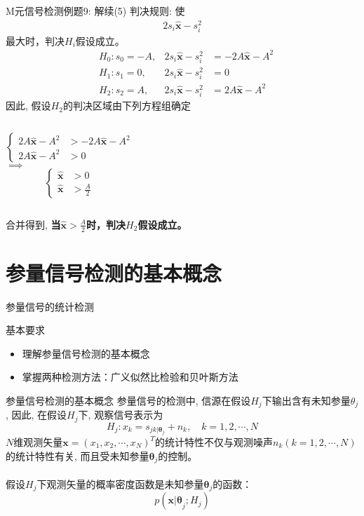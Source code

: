 \begin{frame}[shrink]{M元信号检测例题9: 解续(5)}
判决规则: 使
\begin{align*}
2s_i\bm{\hat{x}}-s_i^2
\end{align*}
最大时，判决$H_i$假设成立。
\begin{align*}
&H_0: s_0=-A, &2s_i\bm{\hat{x}}-s_i^2&=-2A\bm{\hat{x}}-A^2\\
&H_1: s_1=0, &2s_i\bm{\hat{x}}-s_i^2&=0\\
&H_2: s_2=A, &2s_i\bm{\hat{x}}-s_i^2&=2A\bm{\hat{x}}-A^2
\end{align*}
因此, 假设$H_2$的判决区域由下列方程组确定
\begin{columns}
$$
\begin{cases}
2A\bm{\hat{x}}-A^2 &> -2A\bm{\hat{x}}-A^2\\
2A\bm{\hat{x}}-A^2 &> 0
\end{cases}
$$
$\implies$
$$
\begin{cases}
\bm{\hat{x}}&> 0\\
\bm{\hat{x}}&> \frac{A}{2}
\end{cases}
$$
\end{columns}
合并得到, \textbf{当$\bm{\hat{x}}>\frac{A}{2}$时，判决$H_2$假设成立。}
\end{frame}

\section{参量信号检测的基本概念}

\begin{frame}{参量信号的统计检测}
\begin{block}{基本要求}
	\begin{itemize}
		\setlength{\itemsep}{.5cm}
		\item 理解参量信号检测的基本概念
		\item 掌握两种检测方法：广义似然比检验和贝叶斯方法		
	\end{itemize}
\end{block}
\end{frame}

\begin{frame}[shrink]{参量信号检测的基本概念}
参量信号的检测中, 信源在假设$H_j$下输出含有未知参量$\theta_j$, 因此, 在假设$H_j$下, 观察信号表示为
\[ H_j: x_k=s_{jk|\bm{\theta}_j} + n_k,\quad k=1,2,\cdots,N \]
$N$维观测矢量$\bm{x}=(x_1,x_2,\cdots,x_N)^T$的统计特性不仅与观测噪声$n_k(k=1,2,\cdots,N)$的统计特性有关, 而且受未知参量$\bm{\theta}_j$的控制。\\
~\\
假设$H_j$下观测矢量的概率密度函数是未知参量$\bm{\theta}_j$的函数：
\[ p(\bm{x|\theta}_j; H_j)\]
\end{frame}


